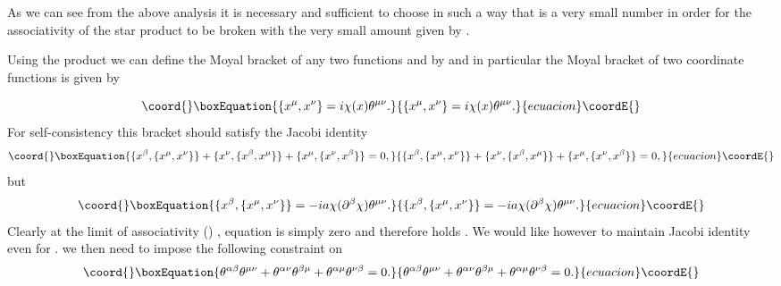 \documentclass[a4paper,12pt]{article}
\begin{document}
 As we can see from the above analysis it is
necessary and sufficient to choose \myHighlight{${\theta}$}\coordHE{} in such a way that
 \coordHE{} is a very small number in order for the associativity
of the star product \coordHE{} to be broken with the very small
amount given by \coordHE{} .


Using the \myHighlight{$*$}\coordHE{} product \coordHE{} we can define the Moyal bracket of
any two functions \coordHE{} and \coordHE{} by \coordHE{} and in particular the Moyal bracket of two coordinate
functions is given by

\begin{equation}\coord{}\boxEquation{
\{x^{\mu},x^{\nu}\}=i{\chi}(x){\theta}^{{\mu}{\nu}}.
}{
\{x^{\mu},x^{\nu}\}=i{\chi}(x){\theta}^{{\mu}{\nu}}.
}{ecuacion}\coordE{}\end{equation}
For self-consistency this bracket should satisfy the Jacobi identity
\begin{equation}\coord{}\boxEquation{
\{x^{\beta},\{x^{\mu},x^{\nu}\}\}+\{x^{\nu},\{x^{\beta},x^{\mu}\}\}+\{x^{\mu},\{x^{\nu},x^{\beta}\}\}=0 ,
}{
\{x^{\beta},\{x^{\mu},x^{\nu}\}\}+\{x^{\nu},\{x^{\beta},x^{\mu}\}\}+\{x^{\mu},\{x^{\nu},x^{\beta}\}\}=0 ,
}{ecuacion}\coordE{}\end{equation}
but
\begin{equation}\coord{}\boxEquation{
\{x^{\beta},\{x^{\mu},x^{\nu}\}\}=-ia{\chi}({\partial}^{\beta}{\chi}){\theta}^{{\mu}{\nu}}.
}{
\{x^{\beta},\{x^{\mu},x^{\nu}\}\}=-ia{\chi}({\partial}^{\beta}{\chi}){\theta}^{{\mu}{\nu}}.
}{ecuacion}\coordE{}\end{equation}
Clearly at the limit of associativity (\coordHE{})
 , equation \coordHE{} is simply zero and therefore \coordHE{} holds . We
would like however to maintain Jacobi identity even for
\coordHE{} . we then need to impose the following constraint on
\myHighlight{${\theta}$}\coordHE{}
\begin{equation}\coord{}\boxEquation{
{\theta}^{{\alpha}{\beta}}{\theta}^{{\mu}{\nu}}+{\theta}^{{\alpha}{\nu}}{\theta}^{{\beta}{\mu}}+{\theta}^{{\alpha}{\mu}}{\theta}^{{\nu}{\beta}}=0.
}{
{\theta}^{{\alpha}{\beta}}{\theta}^{{\mu}{\nu}}+{\theta}^{{\alpha}{\nu}}{\theta}^{{\beta}{\mu}}+{\theta}^{{\alpha}{\mu}}{\theta}^{{\nu}{\beta}}=0.
}{ecuacion}\coordE{}\end{equation}
\end{document}
